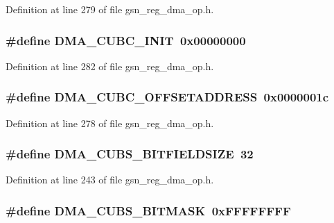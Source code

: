 Definition at line 279 of file gsn\_\-reg\_\-dma\_\-op.h.

\hypertarget{a00547_a585beb2ca81b46173e78cec8544d35fb}{
\subsubsection[{DMA\_\-CUBC\_\-INIT}]{\setlength{\rightskip}{0pt plus 5cm}\#define DMA\_\-CUBC\_\-INIT~0x00000000}}
\label{a00547_a585beb2ca81b46173e78cec8544d35fb}


Definition at line 282 of file gsn\_\-reg\_\-dma\_\-op.h.

\hypertarget{a00547_ad058d6e38845a244f2613c7f06e75468}{
\subsubsection[{DMA\_\-CUBC\_\-OFFSETADDRESS}]{\setlength{\rightskip}{0pt plus 5cm}\#define DMA\_\-CUBC\_\-OFFSETADDRESS~0x0000001c}}
\label{a00547_ad058d6e38845a244f2613c7f06e75468}


Definition at line 278 of file gsn\_\-reg\_\-dma\_\-op.h.

\hypertarget{a00547_aa9969448e57b7405a1c5a99f998012f9}{
\subsubsection[{DMA\_\-CUBS\_\-BITFIELDSIZE}]{\setlength{\rightskip}{0pt plus 5cm}\#define DMA\_\-CUBS\_\-BITFIELDSIZE~32}}
\label{a00547_aa9969448e57b7405a1c5a99f998012f9}


Definition at line 243 of file gsn\_\-reg\_\-dma\_\-op.h.

\hypertarget{a00547_a93acd3ca9a406ea92b1fe47474e59e3c}{
\subsubsection[{DMA\_\-CUBS\_\-BITMASK}]{\setlength{\rightskip}{0pt plus 5cm}\#define DMA\_\-CUBS\_\-BITMASK~0xFFFFFFFF}}
\label{a00547_a93acd3ca9a406ea92b1fe47474e59e3c}


